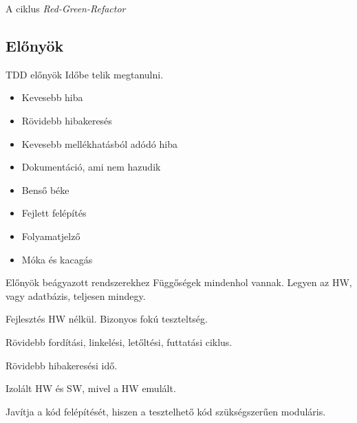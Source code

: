 \begin{frame}{A ciklus}
  \textit{Red-Green-Refactor}
\end{frame}

\subsection{Előnyök}

\begin{frame}{TDD előnyök}
  Időbe telik megtanulni.

  \pause

  \begin{itemize}[<+->]
  \item Kevesebb hiba
  \item Rövidebb hibakeresés
  \item Kevesebb mellékhatásból adódó hiba
  \item Dokumentáció, ami nem hazudik
  \item Benső béke
  \item Fejlett felépítés
  \item Folyamatjelző
  \item Móka és kacagás
  \end{itemize}

\end{frame}

\begin{frame}{Előnyök beágyazott rendszerekhez}
  Függőségek mindenhol vannak. Legyen az HW, vagy adatbázis, teljesen mindegy.

  \pause
  Fejlesztés HW nélkül. Bizonyos fokú teszteltség.

  \pause
  Rövidebb fordítási, linkelési, letőltési, futtatási ciklus.

  \pause
  Rövidebb hibakeresési idő.

  \pause
  Izolált HW és SW, mivel a HW emulált.

  \pause
  Javítja a kód felépítését, hiszen a tesztelhető kód szükségszerűen moduláris.
\end{frame}

